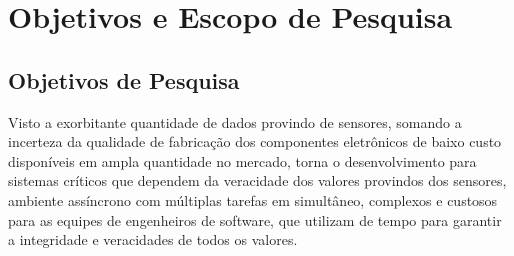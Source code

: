 



\section{Objetivos e Escopo de Pesquisa}
\subsection{Objetivos de Pesquisa}
Visto a exorbitante quantidade de dados provindo de sensores, somando a incerteza da qualidade de fabricação dos componentes eletrônicos de baixo custo disponíveis em ampla quantidade no mercado, torna o desenvolvimento para sistemas críticos que dependem da veracidade dos valores provindos dos sensores, ambiente assíncrono com múltiplas tarefas em simultâneo, complexos e custosos para as equipes de engenheiros de software, que utilizam de tempo para garantir a integridade e veracidades de todos os valores.

